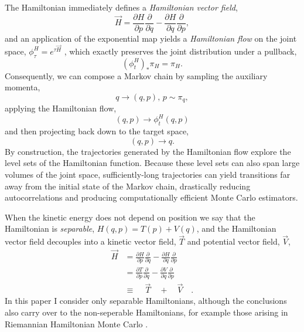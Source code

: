 \documentclass{article}
\begin{document}
The Hamiltonian immediately defines a \textit{Hamiltonian vector field},
%
\begin{equation*}
\vec{H} 
= 
\frac{ \partial H }{ \partial p } \frac{ \partial }{ \partial q}
- \frac{ \partial H }{ \partial q } \frac{ \partial }{ \partial p},
\end{equation*}
%
and an application of the exponential map yields a \textit{Hamiltonian flow}
on the joint space, $\phi^{H}_{\tau} = e^{\tau \vec{H}}$ \citep{Lee:2013},
which exactly preserves the joint distribution under a pullback,
%
\begin{equation*}
\left( \phi^{H}_{t} \right)_{*} \pi_{H} = \pi_{H}.
\end{equation*}
%
Consequently, we can compose a Markov chain by sampling the auxiliary 
momenta, 
%
\begin{equation*}
q \rightarrow (q, p), \, p \sim \pi_{q},
\end{equation*}
%
applying the Hamiltonian flow,
%
\begin{equation*}
(q, p) \rightarrow \phi^{H}_{t} (q, p)
\end{equation*}
%
and then projecting back down to the target space,
%
\begin{equation*}
(q, p) \rightarrow q.
\end{equation*}
%
By construction, the trajectories generated by the Hamiltonian flow 
explore the level sets of the Hamiltonian function.  Because these 
level sets can also span large volumes of the joint space, sufficiently-long 
trajectories can yield transitions far away from the initial state of the 
Markov chain, drastically reducing autocorrelations and producing 
computationally efficient Monte Carlo estimators.

When the kinetic energy does not depend on position we say that
the Hamiltonian is \textit{separable}, $H (q, p) = T (p) + V (q)$,  and
the Hamiltonian vector field decouples into a kinetic vector field,
$\vec{T}$ and potential vector field, $\vec{V}$,
%
\begin{align*}
\vec{H} 
&= 
\frac{ \partial H }{ \partial p } \frac{ \partial }{ \partial q}
- \frac{ \partial H }{ \partial q } \frac{ \partial }{ \partial p}
\\
&= 
\frac{ \partial T }{ \partial p } \frac{ \partial }{ \partial q}
- \frac{ \partial V }{ \partial q } \frac{ \partial }{ \partial p}
\\
&\equiv
\quad\, \vec{T} \quad + \quad \vec{V} \quad.
\end{align*}
%
In this paper I consider only separable Hamiltonians, although
the conclusions also carry over to the non-seperable Hamiltonians,
for example those arising in
Riemannian Hamiltonian Monte Carlo \cite{GirolamiEtAl:2011}.
\end{document}
